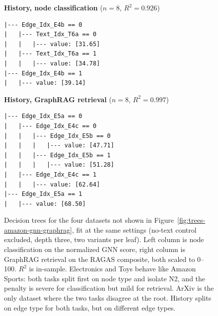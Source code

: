 \begin{figure}[t]
\begin{minipage}[t]{0.48\textwidth}
\centering\textbf{History, node classification} ($n{=}8$, $R^2{=}0.926$)
\begin{verbatim}
|--- Edge_Idx_E4b == 0
|   |--- Text_Idx_T6a == 0
|   |   |--- value: [31.65]
|   |--- Text_Idx_T6a == 1
|   |   |--- value: [34.78]
|--- Edge_Idx_E4b == 1
|   |--- value: [39.14]
\end{verbatim}
\end{minipage}
\hfill
\begin{minipage}[t]{0.48\textwidth}
\centering\textbf{History, GraphRAG retrieval} ($n{=}8$, $R^2{=}0.997$)
\begin{verbatim}
|--- Edge_Idx_E5a == 0
|   |--- Edge_Idx_E4c == 0
|   |   |--- Edge_Idx_E5b == 0
|   |   |   |--- value: [47.71]
|   |   |--- Edge_Idx_E5b == 1
|   |   |   |--- value: [51.28]
|   |--- Edge_Idx_E4c == 1
|   |   |--- value: [62.64]
|--- Edge_Idx_E5a == 1
|   |--- value: [68.50]
\end{verbatim}
\end{minipage}
\vspace{0.4em}
\caption{Decision trees for the four datasets not shown in Figure~\ref{fig:trees-amazon-gnn-graphrag}, fit at the same settings (no-text control excluded, depth three, two variants per leaf). Left column is node classification on the normalized GNN score, right column is GraphRAG retrieval on the RAGAS composite, both scaled to 0--100. $R^2$ is in-sample. Electronics and Toys behave like Amazon Sports: both tasks split first on node type and isolate N2, and the penalty is severe for classification but mild for retrieval. ArXiv is the only dataset where the two tasks disagree at the root. History splits on edge type for both tasks, but on different edge types.}
\label{fig:trees-appendix}
\end{figure}
